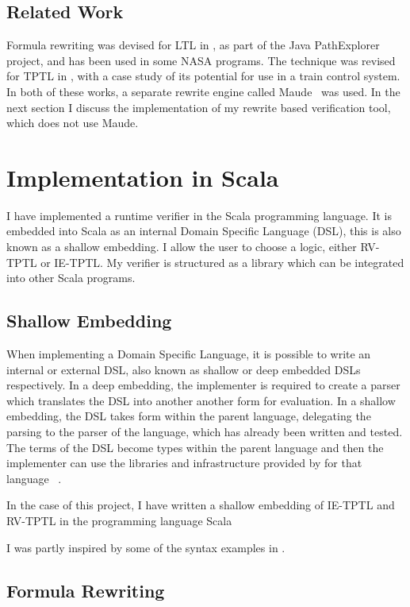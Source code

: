 \documentclass[a4paper]{article}
\begin{document}
\subsection{Related Work}
Formula rewriting was devised for LTL in \textcite{rosu2005rewriting}, as part of the Java PathExplorer project, and has been used in some NASA programs. The technique was revised for TPTL in \textcite{chai2013rewriting}, with a case study of its potential for use in a train control system. In both of these works, a separate rewrite engine called Maude~\autocite{clavel2002maude} was used. In the next section I discuss the implementation of my rewrite based verification tool, which does not use Maude.

\section{Implementation in Scala}\label{implementaion}
I have implemented a runtime verifier in the Scala programming language.
It is embedded into Scala as an internal Domain Specific Language (DSL), this is also known as a shallow embedding.
I allow the user to choose a logic, either RV-TPTL or IE-TPTL.
My verifier is structured as a library which can be integrated into other Scala programs.

\subsection{Shallow Embedding}
When implementing a Domain Specific Language, it is possible to write an internal or external DSL, also known as shallow or deep embedded DSLs respectively. In a deep embedding, the implementer is required to create a parser which translates the DSL into another another form for evaluation. In a shallow embedding, the DSL takes form within the parent language, delegating the parsing to the parser of the language, which has already been written and tested. The terms of the DSL become types within the parent language and then the implementer can use the libraries and infrastructure provided by for that language~
\autocite{gibbons2014foldingdeepshallow}.

In the case of this project, I have written a shallow embedding of IE-TPTL and RV-TPTL in the programming language Scala~\autocite{}

I was partly inspired by some of the syntax examples in \textcite{barringer2011tracecontract}.
\subsection{Formula Rewriting}
\end{document}
